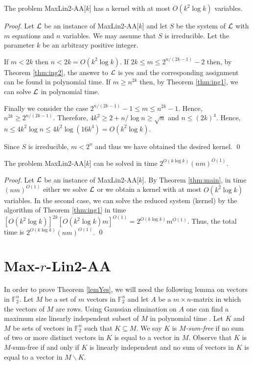\documentclass{llncs}
\begin{document}
\begin{theorem}\label{thm:main}
The problem {\sc MaxLin2-AA}[$k$] has a kernel with at most $O(k^2\log k)$ variables.
\end{theorem}
\begin{proof}
Let $\cal L$ be an instance of {\sc MaxLin2-AA}[$k$] and let $S$ be
the system of $\cal L$ with $m$ equations and $n$ variables.
We may assume that $S$ is irreducible. Let the parameter $k$ be an
arbitrary positive integer.

If $m<2k$ then $n<2k=O(k^2\log k)$. If $2k\le m\le 2^{n/(2k-1)}-2$
then, by Theorem \ref{thm:ing2}, the answer to $\cal L$ is {\sc yes}
and the corresponding assignment can be found in polynomial time. If $m\ge
n^{2k}$ then, by Theorem \ref{thm:ing1}, we can solve $\cal L$ in
polynomial time.

Finally we consider the case $2^{n/(2k-1)}-1 \le m \le n^{2k}-1$.
Hence, $n^{2k}\ge 2^{n/(2k-1)}.$
Therefore, $4k^2\ge 2+n/\log n \ge \sqrt{n}$ and $n\le (2k)^4$. Hence,
$n\le 4k^2\log n\le 4k^2\log(16k^4)=O(k^2\log k).$

Since $S$ is irreducible, $m<2^n$ and thus we have obtained the desired kernel.
\qed
\end{proof}

\begin{corollary}\label{cor1}
The problem {\sc MaxLin2-AA}[$k$] can be solved in time $2^{O(k\log k)}(nm)^{O(1)}$.
\end{corollary}
\begin{proof}
Let $\cal L$ be an instance of {\sc MaxLin2-AA}[$k$]. By Theorem \ref{thm:main}, in time $(nm)^{O(1)}$ either we solve
$\cal L$ or we obtain a kernel
with at most $O(k^2\log k)$ variables. In the second case, we can solve the reduced system (kernel) by the algorithm of
Theorem \ref{thm:ing1} in time
$[O(k^2\log k)]^{2k}[O(k^2\log k)m]^{O(1)}=2^{O(k\log k)}m^{O(1)}$. Thus, the total time is $2^{O(k\log k)}(nm)^{O(1)}.$
\qed \end{proof}

\section{Max-$r$-Lin2-AA}\label{sec:max-r-lin2}

In order to prove Theorem \ref{lemYes}, we will need the following lemma on vectors in $\mathbb{F}^n_2$.
Let $M$ be a set of $m$ vectors in $\mathbb{F}_2^n$ and let $A$ be a $m\times n$-matrix in which the
vectors of $M$ are rows. Using Gaussian elimination on $A$ one can find a maximum size
linearly independent subset of $M$ in polynomial time \cite{KorVyg2006}.
Let $K$ and $M$ be sets of vectors in $\mathbb{F}^n_2$ such that $K \subseteq M$. We say $K$ is \emph{$M$-sum-free}
if no sum of two or more distinct vectors in $K$ is equal to a vector in $M$. Observe that $K$ is $M$-sum-free if
and only if $K$ is linearly independent and no sum of vectors in $K$ is equal to a vector in $M \backslash K$.
\end{document}
